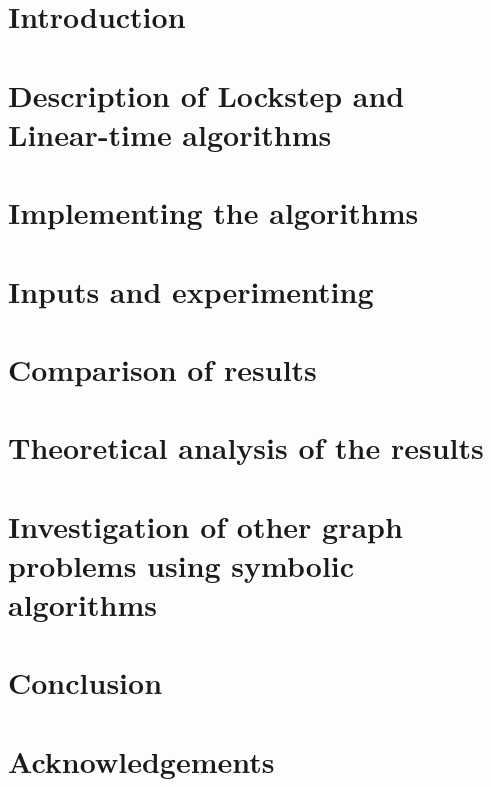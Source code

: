 \documentclass[a4, english]{article}
\title{\titlecontent}
\author{Magdalena Kalin-Czerska}
\author{Jonathan Eilath}
\author{Mikael Bisgaard Dahlsen-Jensen}
\affil{Aarhus University}
\newcommand{\sectionpath}{../sections/}
\begin{document}
 \pagestyle{empty}

\maketitle

\newpage

\section{Introduction}

\section{Description of  Lockstep and Linear-time algorithms}

\section{Implementing the algorithms}

\section{Inputs and experimenting}

\section{Comparison of results}

\section{Theoretical analysis of the results}

\section{Investigation of other graph problems using symbolic algorithms}

\section{Conclusion}

\section{Acknowledgements}

\printbibliography
\appendix
\end{document}
